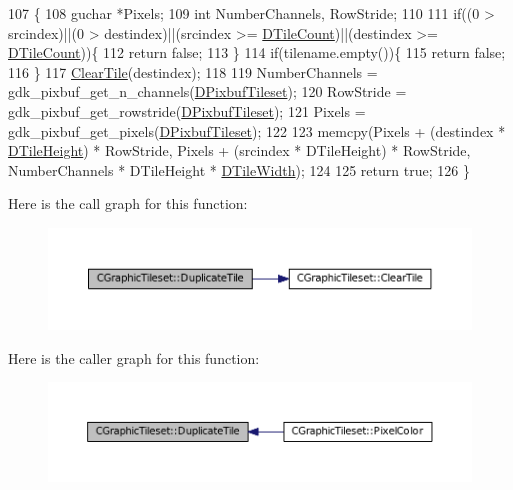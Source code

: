\begin{DoxyCode}
107                                                                                          \{
108     guchar *Pixels;
109     \textcolor{keywordtype}{int} NumberChannels, RowStride;
110     
111     \textcolor{keywordflow}{if}((0 > srcindex)||(0 > destindex)||(srcindex >= \hyperlink{classCGraphicTileset_a39d942b370e47f441bf97385eb1037c8}{DTileCount})||(destindex >= 
      \hyperlink{classCGraphicTileset_a39d942b370e47f441bf97385eb1037c8}{DTileCount}))\{
112         \textcolor{keywordflow}{return} \textcolor{keyword}{false};
113     \}
114     \textcolor{keywordflow}{if}(tilename.empty())\{
115         \textcolor{keywordflow}{return} \textcolor{keyword}{false};
116     \}
117     \hyperlink{classCGraphicTileset_aefeefc9e2ad01ceb8a781bd455859f76}{ClearTile}(destindex);
118     
119     NumberChannels = gdk\_pixbuf\_get\_n\_channels(\hyperlink{classCGraphicTileset_a5d5adfcdbb347a6df3f57535ca08e3ef}{DPixbufTileset});
120     RowStride = gdk\_pixbuf\_get\_rowstride(\hyperlink{classCGraphicTileset_a5d5adfcdbb347a6df3f57535ca08e3ef}{DPixbufTileset});
121     Pixels = gdk\_pixbuf\_get\_pixels(\hyperlink{classCGraphicTileset_a5d5adfcdbb347a6df3f57535ca08e3ef}{DPixbufTileset});
122     
123     memcpy(Pixels + (destindex * \hyperlink{classCGraphicTileset_af48f32e07d5fe69afd5f764318cc3244}{DTileHeight}) * RowStride, Pixels + (srcindex * DTileHeight) * 
      RowStride, NumberChannels * DTileHeight * \hyperlink{classCGraphicTileset_a2d0c7d19865b81911a3a43d5cae50e00}{DTileWidth});
124 
125     \textcolor{keywordflow}{return} \textcolor{keyword}{true};
126 \}
\end{DoxyCode}
Here is the call graph for this function\+:\nopagebreak
\begin{figure}[H]
\begin{center}
\leavevmode
\includegraphics[width=350pt]{classCGraphicTileset_a78db70086b4cd1085fd3b5d0d0dc5fdd_cgraph}
\end{center}
\end{figure}
Here is the caller graph for this function\+:\nopagebreak
\begin{figure}[H]
\begin{center}
\leavevmode
\includegraphics[width=350pt]{classCGraphicTileset_a78db70086b4cd1085fd3b5d0d0dc5fdd_icgraph}
\end{center}
\end{figure}
\hypertarget{classCGraphicTileset_a87047c22039dc6137b790b7609c627a8}{}\label{classCGraphicTileset_a87047c22039dc6137b790b7609c627a8} 
